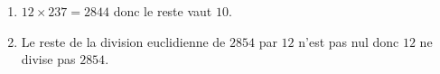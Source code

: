     \begin{enumerate}
        \item $12\times 237 = \num{2844}$ donc le reste vaut $10$.
        \item Le reste de la division euclidienne de $\num{2 854}$ par $12$ n'est pas nul donc $12$ ne divise pas $\num{2 854}$.
    \end{enumerate}
